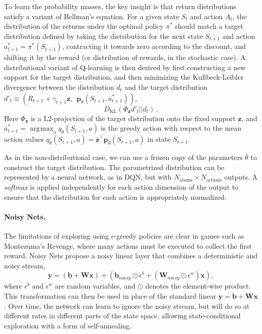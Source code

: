 \documentclass[letterpaper]{article} %
\def\z{\bm z}
\def\y{\bm y}
\def\b{\bm b}
\def\x{\bm x}
\def\W{\textbf{W}}
\def\p{\bm p}
\DeclareMathOperator*{\argmax}{\arg\!\max}
\begin{document}
To learn the probability masses, the key insight is that return distributions satisfy a variant of Bellman's equation. For a given state $S_{t}$ and action $A_{t}$, the distribution of the returns under the optimal policy $\pi^*$ should match a target distribution defined by taking the distribution for the next state $S_{t+1}$ and action $a^*_{t+1} = \pi^*(S_{t+1})$, contracting it towards zero according to the discount, and shifting it by the reward (or distribution of rewards, in the stochastic case).  A distributional variant of Q-learning is then derived by first constructing a new support for the target distribution, and then minimizing the Kullbeck-Leibler divergence between the distribution $d_t$ and the target distribution $d'_t \equiv (R_{t+1} + \gamma_{t+1} \z, ~~\p_{\overline{\theta}}(S_{t+1}, \overline{a}^*_{t+1}))$,
\begin{equation} \label{DistribLoss}
D_{\text{KL}}(\Phi_{\z} d'_t || d_t) \,.
\end{equation}
Here $\Phi_{\z}$ is a L2-projection of the target distribution onto the fixed support $\z$, and $\overline{a}^*_{t+1} = \argmax_a q_{\overline{\theta}}(S_{t+1}, a)$ is the greedy action with respect to the mean action values $q_{\overline{\theta}}(S_{t+1}, a) = \z^{\top} \p_{\theta}(S_{t+1}, a)$ in state $S_{t+1}$.

As in the non-distributional case, we can use a frozen copy of the parameters $\overline{\theta}$ to construct the target distribution. The parametrized distribution can be represented by a neural network, as in DQN, but with $N_{\text{atoms}} \times N_{\text{actions}}$ outputs. A \textit{softmax} is applied independently for each action dimension of the output to ensure that the distribution for each action is appropriately normalized.

\paragraph{Noisy Nets.}
The limitations of exploring using $\epsilon$-greedy policies are clear in games such as Montezuma's Revenge, where many actions must be executed to collect the first reward. Noisy Nets \cite{FortunatoAPMOGM17} propose a noisy linear layer that combines a deterministic and noisy stream,
%
\begin{equation} \label{Noisy}
\y = (\b + \W \x) + (\b_{noisy} \odot \epsilon^b + (\W_{noisy} \odot  \epsilon^w)\x),
\end{equation}
%
\noindent where $\epsilon^b$ and $\epsilon^w$ are random variables, and $\odot$ denotes the element-wise product. This transformation can then be used in place of the standard linear $\y = \b + \W \x$. Over time, the network can learn to ignore the noisy stream, but will do so at different rates in different parts of the state space, allowing state-conditional exploration with a form of self-annealing. 
\end{document}
